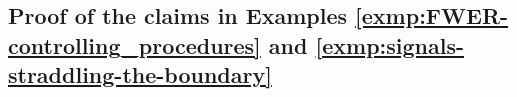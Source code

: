 \subsection{Proof of the claims in Examples \ref{exmp:FWER-controlling_procedures} and \ref{exmp:signals-straddling-the-boundary}}
\label{subsec:proofs-examples}






